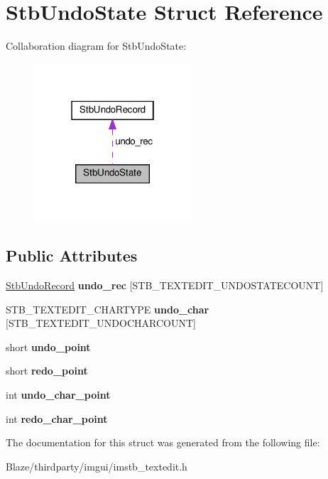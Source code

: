 \hypertarget{structStbUndoState}{}\section{Stb\+Undo\+State Struct Reference}
\label{structStbUndoState}


Collaboration diagram for Stb\+Undo\+State\+:\nopagebreak
\begin{figure}[H]
\begin{center}
\leavevmode
\includegraphics[width=166pt]{structStbUndoState__coll__graph}
\end{center}
\end{figure}
\subsection*{Public Attributes}
\begin{DoxyCompactItemize}
\item 
\mbox{\label{structStbUndoState_a8cb07be8f304d1620b50bd024709023f}} 
\hyperlink{structStbUndoRecord}{Stb\+Undo\+Record} {\bfseries undo\+\_\+rec} \mbox{[}S\+T\+B\+\_\+\+T\+E\+X\+T\+E\+D\+I\+T\+\_\+\+U\+N\+D\+O\+S\+T\+A\+T\+E\+C\+O\+U\+NT\mbox{]}
\item 
\mbox{\label{structStbUndoState_a88320a054aaf18ca122c2b23903a8677}} 
S\+T\+B\+\_\+\+T\+E\+X\+T\+E\+D\+I\+T\+\_\+\+C\+H\+A\+R\+T\+Y\+PE {\bfseries undo\+\_\+char} \mbox{[}S\+T\+B\+\_\+\+T\+E\+X\+T\+E\+D\+I\+T\+\_\+\+U\+N\+D\+O\+C\+H\+A\+R\+C\+O\+U\+NT\mbox{]}
\item 
\mbox{\label{structStbUndoState_ad29a8695b3e8252ac164d0c2d0be7d7c}} 
short {\bfseries undo\+\_\+point}
\item 
\mbox{\label{structStbUndoState_a719ba014b2db8a8ea55739664b445af0}} 
short {\bfseries redo\+\_\+point}
\item 
\mbox{\label{structStbUndoState_a1e93b8c26a8a23536921d125aceacd06}} 
int {\bfseries undo\+\_\+char\+\_\+point}
\item 
\mbox{\label{structStbUndoState_aab6e5eeb964882e6d9f5d2952b7352e3}} 
int {\bfseries redo\+\_\+char\+\_\+point}
\end{DoxyCompactItemize}


The documentation for this struct was generated from the following file\+:\begin{DoxyCompactItemize}
\item 
Blaze/thirdparty/imgui/imstb\+\_\+textedit.\+h\end{DoxyCompactItemize}
